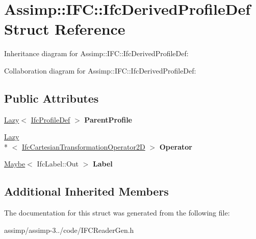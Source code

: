 \hypertarget{struct_assimp_1_1_i_f_c_1_1_ifc_derived_profile_def}{\section{Assimp\+:\+:I\+F\+C\+:\+:Ifc\+Derived\+Profile\+Def Struct Reference}
\label{struct_assimp_1_1_i_f_c_1_1_ifc_derived_profile_def}
}


Inheritance diagram for Assimp\+:\+:I\+F\+C\+:\+:Ifc\+Derived\+Profile\+Def\+:


Collaboration diagram for Assimp\+:\+:I\+F\+C\+:\+:Ifc\+Derived\+Profile\+Def\+:
\subsection*{Public Attributes}
\begin{DoxyCompactItemize}
\item 
\hypertarget{struct_assimp_1_1_i_f_c_1_1_ifc_derived_profile_def_a8636025d0686acffdb07ab849898bc0f}{\hyperlink{struct_assimp_1_1_s_t_e_p_1_1_lazy}{Lazy}$<$ \hyperlink{struct_assimp_1_1_i_f_c_1_1_ifc_profile_def}{Ifc\+Profile\+Def} $>$ {\bfseries Parent\+Profile}}\label{struct_assimp_1_1_i_f_c_1_1_ifc_derived_profile_def_a8636025d0686acffdb07ab849898bc0f}

\item 
\hypertarget{struct_assimp_1_1_i_f_c_1_1_ifc_derived_profile_def_ad07cfb8d3d4c9a974cfce261f5235a27}{\hyperlink{struct_assimp_1_1_s_t_e_p_1_1_lazy}{Lazy}\\*
$<$ \hyperlink{struct_assimp_1_1_i_f_c_1_1_ifc_cartesian_transformation_operator2_d}{Ifc\+Cartesian\+Transformation\+Operator2\+D} $>$ {\bfseries Operator}}\label{struct_assimp_1_1_i_f_c_1_1_ifc_derived_profile_def_ad07cfb8d3d4c9a974cfce261f5235a27}

\item 
\hypertarget{struct_assimp_1_1_i_f_c_1_1_ifc_derived_profile_def_a251f1909169f560f404a5283a1cf0bce}{\hyperlink{struct_assimp_1_1_s_t_e_p_1_1_maybe}{Maybe}$<$ Ifc\+Label\+::\+Out $>$ {\bfseries Label}}\label{struct_assimp_1_1_i_f_c_1_1_ifc_derived_profile_def_a251f1909169f560f404a5283a1cf0bce}

\end{DoxyCompactItemize}
\subsection*{Additional Inherited Members}


The documentation for this struct was generated from the following file\+:\begin{DoxyCompactItemize}
\item 
assimp/assimp-\/3../code/I\+F\+C\+Reader\+Gen.\+h\end{DoxyCompactItemize}
